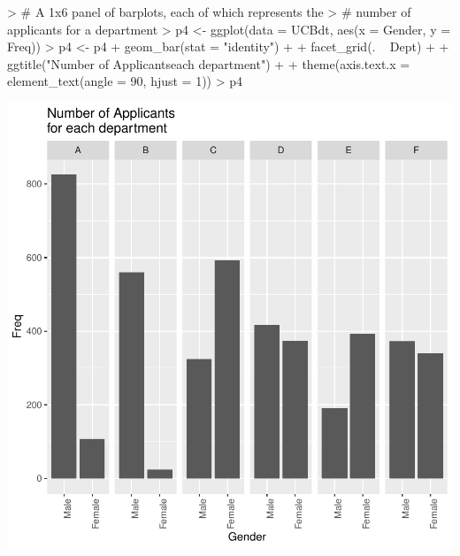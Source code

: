 \documentclass[12pt,letterpaper,final]{article}
\begin{document}
\begin{Schunk}
\begin{Sinput}
> # A 1x6 panel of barplots, each of which represents the 
> # number of applicants for a department
> p4 <- ggplot(data = UCBdt, aes(x = Gender, y = Freq))
> p4 <- p4 + geom_bar(stat = "identity") + 
+   facet_grid(. ~ Dept) + 
+   ggtitle("Number of Applicants\nfor each department") + 
+   theme(axis.text.x = element_text(angle = 90, hjust = 1))
> p4
\end{Sinput}
\end{Schunk}
\includegraphics{lect_main-019}
\end{document}
